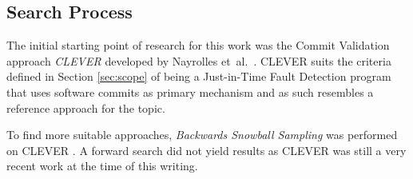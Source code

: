 
\subsection{Search Process}
\label{sec:searchprocess}

The initial starting point of research for this work was the Commit Validation approach \textit{CLEVER} developed by Nayrolles et~al.~\cite{Nayrolles2018}. CLEVER suits the criteria defined in Section \ref{sec:scope} of being a Just-in-Time Fault Detection program that uses software commits as primary mechanism and as such resembles a reference approach for the topic.  

To find more suitable approaches, \textit{Backwards Snowball Sampling} was performed on CLEVER \cite{10.2307/2237615}. A forward search did not yield results as CLEVER was still a very recent work at the time of this writing.

